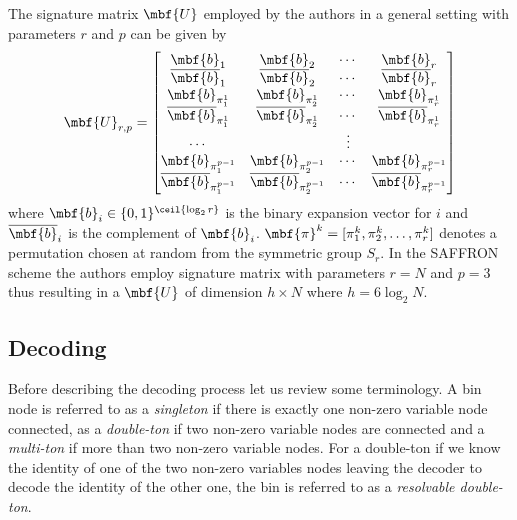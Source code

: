 \documentclass[conference,twocolumn]{IEEEtran}
\begin{document}
{The signature matrix $\mbf{U}$ employed by the authors in a general setting with parameters $r$ and $p$ can be given by
 \begin{align}
\label{Eqn:SignatureMatrix}
\mbf{U}_{r,p}=\begin{bmatrix}
\mbf{b}_1  & \mbf{b}_2 &\cdots & \mbf{b}_r \\
\overline{\mbf{b}}_1 & \overline{\mbf{b}}_2 & \cdots & \overline{\mbf{b}}_r\\
\mbf{b}_{\pi^{1}_{1}} & \mbf{b}_{\pi^{1}_{2}} & \cdots & \mbf{b}_{\pi^{1}_{r}}\\
\overline{\mbf{b}}_{\pi^{1}_{1}} & \overline{\mbf{b}}_{\pi^{1}_{2}} & \cdots & \overline{\mbf{b}}_{\pi^{1}_{r}}\\
\cdots &  &\vdots \\
\mbf{b}_{\pi^{p-1}_{1}} & \mbf{b}_{\pi^{p-1}_{2}} & \cdots & \mbf{b}_{\pi^{p-1}_{r}}\\
\overline{\mbf{b}}_{\pi^{p-1}_{1}} & \overline{\mbf{b}}_{\pi^{p-1}_{2}} & \cdots & \overline{\mbf{b}}_{\pi^{p-1}_{r}}
\end{bmatrix}
\end{align}
where $\mbf{b}_{i}\in\{0,1\}^{\ceil{\log_{2}r}}$ is the binary expansion vector for $i$ and $\overline{\mbf{b}}_{i}$ is the complement of $\mbf{b}_{i}$. $\mbf{\pi}^{k}=[\pi^{k}_1,\pi^{k}_2,\ldots,\pi^{k}_r]$ denotes a permutation chosen at random from the symmetric group $S_{r}$. In the SAFFRON scheme the authors employ signature matrix with parameters $r=N$ and $p=3$ thus resulting in a $\mbf{U}$ of dimension $h \times N$ where $h=6\log_{2}N$.
\subsection*{Decoding}
Before describing the decoding process let us review some terminology. A bin node is referred to as a \textit{singleton} if there is exactly one non-zero variable node connected, as a \textit{double-ton} if two non-zero variable nodes are connected and a \textit{multi-ton} if more than two non-zero variable nodes. For a double-ton if we know the identity of one of the two non-zero variables nodes leaving the decoder to decode the identity of the other one, the bin is referred to as a \textit{resolvable double-ton}.

}
\end{document}
